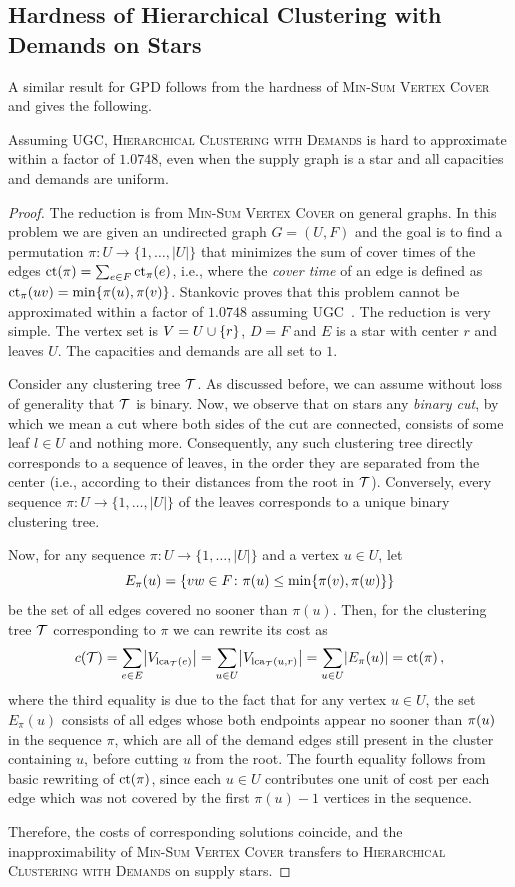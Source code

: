 \subsection{Hardness of Hierarchical Clustering with Demands on Stars}
A similar result for GPD follows from the hardness of \textsc{Min-Sum Vertex Cover} and gives the following.
\begin{theorem}\label{thm:hc-star-hardness}
Assuming UGC, \textsc{Hierarchical Clustering with Demands} is hard to approximate within a factor of $1.0748$,
even when the supply graph is a star and all capacities and demands are uniform.
\end{theorem}
\begin{proof}
The reduction is from \textsc{Min-Sum Vertex Cover} on general graphs. In this problem we are given an undirected graph $G=(U,F)$ and the goal is to find a permutation $\pi\colon U\to\{1,\dots,|U|\}$ that minimizes the sum of cover times of the edges $\text{ct}\mathopen{}\left( \pi \right)=\sum_{e\in F}\text{ct}_\pi(e)$, i.e., where the \emph{cover time} of an edge is defined as $\text{ct}_\pi(uv)=\min\mathopen{}\left\{ \pi(u),\pi(v) \right\}$. Stankovic proves that this problem cannot be approximated within a factor of $1.0748$ assuming UGC~\cite{SomeResultsOnApproximabilityOfMinimumSumVertexCover}. The reduction is very simple. The vertex set is $V=U\cup \mathopen{}\left\{ r \right\}$, $D=F$ and $E$ is a star with center $r$ and leaves $U$. The capacities and demands are all set to $1$.

Consider any clustering tree $\mathcal{T}$. As discussed before, we can assume without loss of generality that $\mathcal{T}$ is binary. Now, we observe that on stars any \emph{binary cut}, by which we mean a cut where both sides of the cut are connected, consists of some leaf $l\in U$ and nothing more. Consequently, any such clustering tree directly corresponds to a sequence of leaves, in the order they are separated from the center (i.e., according to their distances from the root in $\mathcal{T}$). Conversely, every sequence $\pi\colon U\to\{1,\dots,|U|\}$ of the leaves corresponds to a unique binary clustering tree. 

Now, for any sequence $\pi\colon U\to\{1,\dots,|U|\}$ and a vertex $u\in U$, let
\[
E_\pi(u)=\{vw\in F\colon \pi(u)\leq \min\mathopen{}\left\{ \pi(v), \pi(w) \right\}\}
\]
be the set of all edges covered no sooner than $\pi(u)$.
Then, for the clustering tree $\mathcal{T}$ corresponding to $\pi$ we can rewrite its cost as 
\[
c\mathopen{}\left( \mathcal{T} \right)=
\sum_{e\in E} \mathopen{}\left| V_{\operatorname{lca}_{\mathcal{T}}(e)} \right|=
\sum_{u\in U} \mathopen{}\left| V_{\operatorname{lca}_{\mathcal{T}}(u,r)} \right|=
\sum_{u\in U}\mathopen{}\left| E_\pi(u) \right| =
\text{ct}\mathopen{}\left( \pi \right),
\]
where the third equality is due to the fact that for any vertex $u\in U$, the set $E_\pi(u)$ consists of all edges whose both endpoints appear no sooner than $\pi\mathopen{}\left( u \right)$ in the sequence $\pi$, which are all of the demand edges still present in the cluster containing $u$, before cutting $u$ from the root. The fourth equality follows from basic rewriting of $\text{ct}\mathopen{}\left( \pi \right)$, since each $u\in U$ contributes one unit of cost per each edge which was not covered by the first $\pi(u)-1$ vertices in the sequence.

Therefore, the costs of corresponding solutions coincide, and the inapproximability of \textsc{Min-Sum Vertex Cover} transfers to \textsc{Hierarchical Clustering with Demands} on supply stars.
\end{proof}
